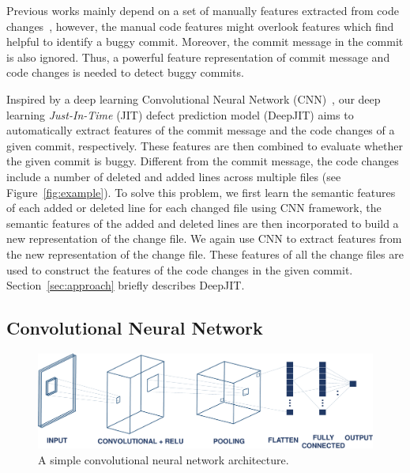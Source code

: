 Previous works mainly depend on a set of manually features extracted from code changes~\cite{Yang:2015:DLJ, mcintosh2018fix}, however, the manual code features might overlook features which find helpful to identify a buggy commit. Moreover, the commit message in the commit is also ignored. Thus, a powerful feature representation of commit message and code changes is needed to detect buggy commits. 

Inspired by a deep learning Convolutional Neural Network (CNN)~\cite{lecun2015deep}, our deep learning \emph{Just-In-Time} (JIT) defect prediction model (DeepJIT) aims to automatically extract features of the commit message and the code changes of a given commit, respectively. These features are then combined to evaluate whether the given commit is buggy. 
Different from the commit message, the code changes include a number of deleted and added lines across multiple files (see Figure~\ref{fig:example}). To solve this problem, we first learn the semantic features of each added or deleted line for each changed file using CNN framework, the semantic features of the added and deleted lines are then incorporated to build a new representation 
of the change file. We again use CNN to extract features from the new representation of the change file. These features of all the change files are used to construct the features of the code changes in the given commit. Section~\ref{sec:approach} briefly describes DeepJIT. 

\subsection{Convolutional Neural Network}
\label{sec:background_cnn}

\begin{figure}[t!]
	\center
	\includegraphics[scale=0.3]{figs/cnn.pdf}
	\caption{A simple convolutional neural network architecture.}
	\label{fig:cnn}
\end{figure}

